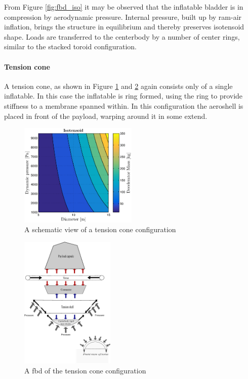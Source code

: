From Figure  \ref{fig:fbd_iso} it may be observed that the inflatable bladder is in compression by aerodynamic pressure. Internal pressure, built up by ram-air inflation, brings the structure in equilibrium and thereby preserves isotensoid shape. Loads are transferred to the centerbody by a number of center rings, similar to the stacked toroid configuration.

\paragraph{Tension cone}

A tension cone, as shown in Figure  \ref{fig:conc_tension} and \ref{fig:fbd_tension} again consists only of a single inflatable. In this case the inflatable is ring formed, using the ring to provide stiffness to a membrane spanned within. In this configuration the aeroshell is placed in front of the payload, warping around it in some extend.

\begin{figure}[H]
\centering
\includegraphics[width = 0.5\textwidth]{Figure/ISO_comp.eps}
\caption{A schematic view of a tension cone configuration}
\label{fig:conc_tension}
\end{figure}

\begin{figure}[H]
\centering
\includegraphics[width = 0.4\textwidth]{Figure/FBD_tensioncone.eps}
\caption{A \gls{fbd} of the tension cone configuration}
\label{fig:fbd_tension}
\end{figure}

